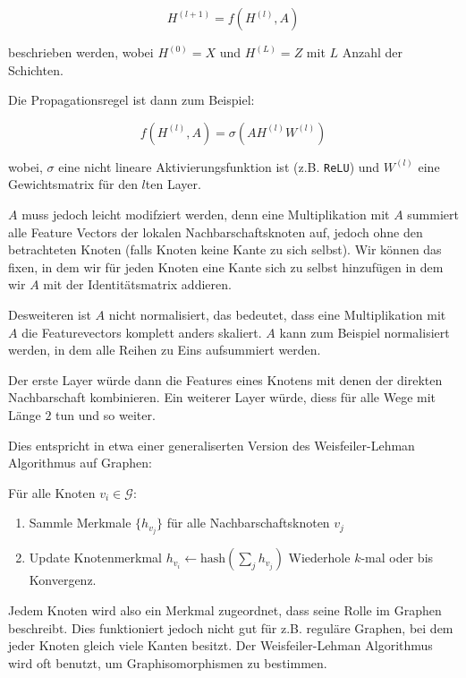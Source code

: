 \documentclass{scrartcl}
\begin{document}
\begin{equation}
  H^{(l+1)} = f(H^{(l)}, A)
\end{equation}

beschrieben werden, wobei $H^{(0)} = X$ und $H^{(L)} = Z$ mit $L$ Anzahl der Schichten.

Die Propagationsregel ist dann zum Beispiel:

\begin{equation}
  f(H^{(l)}, A) = \sigma(AH^{(l)}W^{(l)})
\end{equation}

wobei, $\sigma$ eine nicht lineare Aktivierungsfunktion ist (z.B. \texttt{ReLU}) und $W^{(l)}$ eine Gewichtsmatrix für den $l$ten Layer.

$A$ muss jedoch leicht modifziert werden, denn eine Multiplikation mit $A$ summiert alle Feature Vectors der lokalen Nachbarschaftsknoten auf, jedoch ohne den betrachteten Knoten (falls Knoten keine Kante zu sich selbst).
Wir können das fixen, in dem wir für jeden Knoten eine Kante sich zu selbst hinzufügen in dem wir $A$ mit der Identitätsmatrix addieren.

Desweiteren ist $A$ nicht normalisiert, das bedeutet, dass eine Multiplikation mit $A$ die Featurevectors komplett anders skaliert.
$A$ kann zum Beispiel normalisiert werden, in dem alle Reihen zu Eins aufsummiert werden.

Der erste Layer würde dann die Features eines Knotens mit denen der direkten Nachbarschaft kombinieren.
Ein weiterer Layer würde, diess für alle Wege mit Länge $2$ tun und so weiter.

Dies entspricht in etwa einer generaliserten Version des Weisfeiler-Lehman Algorithmus auf Graphen:

Für alle Knoten $v_i \in \mathcal{G}$:
\begin{enumerate}
  \item Sammle Merkmale $\lbrace h_{v_j} \rbrace$ für alle Nachbarschaftsknoten ${ v_j }$
  \item Update Knotenmerkmal $h_{v_i} \leftarrow \text{hash}(\sum_j h_{v_j})$
Wiederhole $k$-mal oder bis Konvergenz.
\end{enumerate}

Jedem Knoten wird also ein Merkmal zugeordnet, dass seine Rolle im Graphen beschreibt.
Dies funktioniert jedoch nicht gut für z.B. reguläre Graphen, bei dem jeder Knoten gleich viele Kanten besitzt.
Der Weisfeiler-Lehman Algorithmus wird oft benutzt, um Graphisomorphismen zu bestimmen.
\end{document}
